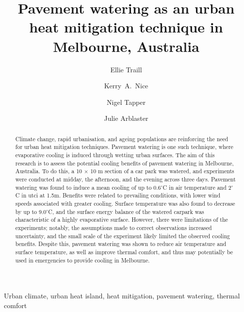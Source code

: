 \documentclass[final,3p,times,authoryear]{elsarticle}
\begin{document}
\title{Pavement watering as an urban heat mitigation technique in Melbourne, Australia}

\author[monash]{Ellie Traill}
\author[melb]{Kerry~A.~Nice}

\author[monash]{Nigel Tapper}
\author[monash]{Julie Arblaster}

\address[melb]{Transport, Health, and Urban Design Research Lab, Faculty of Architecture, Building, and Planning, University of Melbourne, VIC, Australia.}
\address[monash]{School of Earth, Atmosphere and Environment, Monash University, Clayton, VIC 3800, Australia.}




\begin{abstract}

Climate change, rapid urbanisation, and ageing populations are reinforcing the need for urban heat mitigation techniques. Pavement watering is one such technique, where evaporative cooling is induced through wetting urban surfaces. The aim of this research is to assess the potential cooling benefits of pavement watering in Melbourne, Australia. To do this, a 10 $\times$ 10 m section of a car park was watered, and experiments were conducted at midday, the afternoon, and the evening across three days. Pavement watering was found to induce a mean cooling of up to 0.6$^{\circ}$C in air temperature and 2$^{\circ}$C in \gls{utci} at 1.5m. Benefits were related to prevailing conditions, with lower wind speeds associated with greater cooling. Surface temperature was also found to decrease by up to 9.0$^{\circ}$C, and the surface energy balance of the watered carpark was characteristic of a highly evaporative surface. However, there were limitations of the experiments; notably, the assumptions made to correct observations increased uncertainty, and the small scale of the experiment likely limited the observed cooling benefits. Despite this, pavement watering was shown to reduce air temperature and surface temperature, as well as improve thermal comfort, and thus may potentially be used in emergencies to provide cooling in Melbourne.

\end{abstract}

\begin{keyword}
Urban climate\sep
urban heat island\sep 
heat mitigation\sep 
pavement watering\sep 
thermal comfort
\end{keyword}
\end{document}
